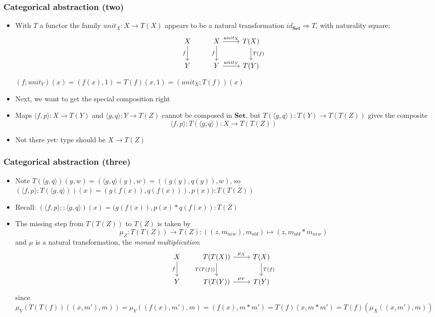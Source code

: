 \documentclass[handout]{beamer}
\newcommand{\To}{\Rightarrow}
\newcommand{\bfsf}[1]{{\boldsymbol{#1}}}
\newcommand{\Set}{\bfsf{Set}}
\newcommand{\Kp}[1]{{\langle #1 \rangle}}
\newcommand{\Kc}{;\!;}
\begin{document}
\frame
  {   
    \frametitle{Categorical abstraction (two)}\label{Mon5:CatAbstrTwo}

 \begin{itemize}[<+->]
\item With $T$ a functor the family $unit_X: X\to T(X)$ appears to be
a natural transformation $id_\Set \To T$, with naturality square:
\[
\begin{tikzcd}[ampersand replacement=\&]
X \arrow[swap]{d}{f} \& X  \arrow[swap]{d}{f}\arrow{r}{unit_X} \&\arrow{d}{T(f)} T(X)\\
Y \& Y  \arrow{r}{unit_Y} \& T(Y)
\end{tikzcd}
\]
$(f;unit_Y)(x)=(f(x),1) = T(f)(x,1) = (unit_X;T(f))(x)$
\item Next,  we want to get the special composition right
\item Maps $\Kp{f,p}: X\to T(Y)$ and $\Kp{g,q}: Y\to T(Z)$ cannot be composed
in $\Set$, but $T(\Kp{g,q}) : T(Y) \to T(T(Z))$ gives the composite
$$\Kp{f,p};T(\Kp{g,q}) : X \to T(T(Z))$$
\item Not there yet: type should be $X \to T(Z)$
 \end{itemize}

 }

\frame
  {   
    \frametitle{Categorical abstraction (three)}\label{Mon5:CatAbstrThree}

 \begin{itemize}[<+->]
\item Note $T(\Kp{g,q})(y,w) =  (\Kp{g,q}(y),w) = ((g(y),q(y)),w)$, so
$(\Kp{f,p};T(\Kp{g,q}))(x) = (g(f(x)),q(f(x))),p(x)): T(T(Z))$
\item Recall: $(\Kp{f,p}\Kc \Kp{g,q})(x) = (g(f(x)),p(x)*q(f(x)) : T(Z)$
\item The missing step from $T(T(Z))$ to $T(Z)$ is taken by
$$\mu_Z: T(T(Z))\to T(Z): ((z,m_{new}),m_{old}) \mapsto (z,m_{old}*m_{new})$$
and $\mu$ is a natural transformation, the \emph{monad multiplication}:
\[
\begin{tikzcd}[ampersand replacement=\&]
X \arrow[swap]{d}{f} \& T(T(X))  \arrow[swap]{d}{T(T(f))}\arrow{r}{\mu_X} \&\arrow{d}{T(f)} T(X)\\
Y \& T(T(Y))  \arrow{r}{\mu_Y} \& T(Y)
\end{tikzcd}
\]
since $\mu_Y(T(T(f))((x,m'),m)) = \mu_Y((f(x),m'),m) = (f(x), m*m') 
= T(f)(x,m*m') = T(f)(\mu_X((x,m'),m))$
 \end{itemize}

 }
\end{document}
